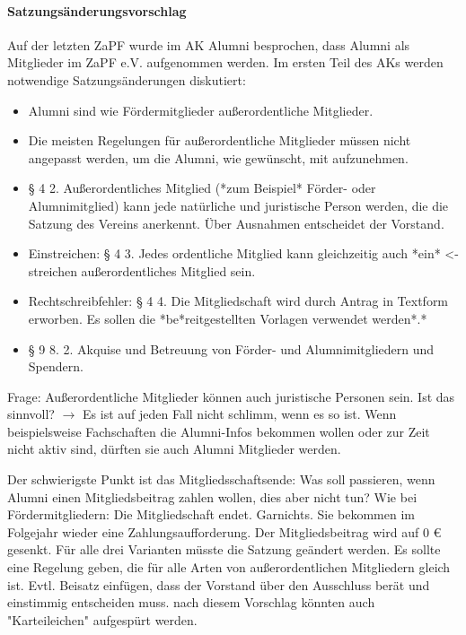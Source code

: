 \paragraph{Satzungsänderungsvorschlag}
Auf der letzten ZaPF wurde im AK Alumni besprochen, dass Alumni als Mitglieder im ZaPF e.V. aufgenommen werden. Im ersten Teil des AKs werden notwendige Satzungsänderungen diskutiert:
\begin{itemize}
\item Alumni sind wie Fördermitglieder außerordentliche Mitglieder.
\item Die meisten Regelungen für außerordentliche Mitglieder müssen nicht angepasst werden, um die Alumni, wie gewünscht, mit aufzunehmen.
        \item § 4 2. Außerordentliches Mitglied (*zum Beispiel* Förder- oder Alumnimitglied) kann jede natürliche und juristische Person werden, die die Satzung des Vereins anerkennt. Über Ausnahmen entscheidet der Vorstand.
        \item \flqq Ein\frqq streichen: § 4 3. Jedes ordentliche Mitglied kann gleichzeitig auch *ein* <- streichen außerordentliches Mitglied sein.
        \item Rechtschreibfehler: § 4 4. Die Mitgliedschaft wird durch Antrag in Textform erworben. Es sollen die *be*reitgestellten Vorlagen verwendet werden*.*
        \item § 9 8. 2. Akquise und Betreuung von Förder- und Alumnimitgliedern und Spendern.
      \end{itemize}
      Frage: Außerordentliche Mitglieder können auch juristische Personen sein. Ist das sinnvoll? $\rightarrow$ Es ist auf jeden Fall nicht schlimm, wenn es so ist. Wenn beispielsweise Fachschaften die Alumni-Infos bekommen wollen oder zur Zeit nicht aktiv sind, dürften sie auch Alumni Mitglieder werden.
      \begin{outline}
        \1 Der schwierigste Punkt ist das Mitgliedsschaftsende:
        \2 Was soll passieren, wenn Alumni einen Mitgliedsbeitrag zahlen wollen, dies aber nicht tun?
        \3 Wie bei Fördermitgliedern: Die Mitgliedschaft endet.
        \3 Garnichts. Sie bekommen im Folgejahr wieder eine Zahlungsaufforderung.
        \3 Der Mitgliedsbeitrag wird auf 0 € gesenkt.
        \2 Für alle drei Varianten müsste die Satzung geändert werden.
        \2 Es sollte eine Regelung geben, die für alle Arten von außerordentlichen Mitgliedern gleich ist. Evtl. Beisatz einfügen, dass der Vorstand über den Ausschluss berät und einstimmig entscheiden muss. nach diesem Vorschlag könnten auch "Karteileichen" aufgespürt werden.
      \end{outline}
